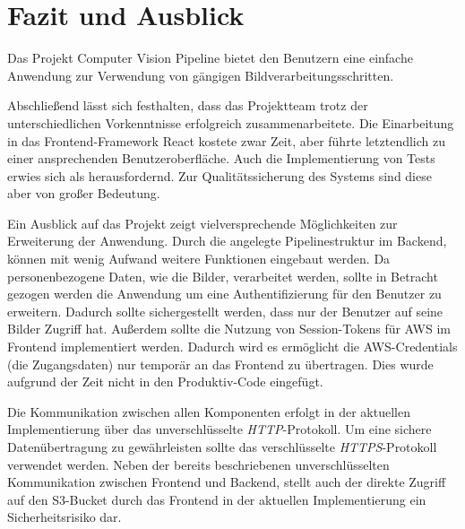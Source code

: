 \section{Fazit und Ausblick}
Das Projekt Computer Vision Pipeline bietet den Benutzern eine einfache Anwendung zur Verwendung von gängigen Bildverarbeitungsschritten.

Abschließend lässt sich festhalten, dass das Projektteam trotz der unterschiedlichen Vorkenntnisse erfolgreich zusammenarbeitete. Die Einarbeitung in das Frontend-Framework React kostete zwar Zeit, aber führte letztendlich zu einer ansprechenden Benutzeroberfläche. Auch die Implementierung von Tests erwies sich als herausfordernd. Zur Qualitätssicherung des Systems sind diese aber von großer Bedeutung.

Ein Ausblick auf das Projekt zeigt vielversprechende Möglichkeiten zur Erweiterung der Anwendung. Durch die angelegte Pipelinestruktur im Backend, können mit wenig Aufwand weitere Funktionen eingebaut werden. Da personenbezogene Daten, wie die Bilder, verarbeitet werden, sollte in Betracht gezogen werden die Anwendung um eine Authentifizierung für den Benutzer zu erweitern. Dadurch sollte sichergestellt werden, dass nur der Benutzer auf seine Bilder Zugriff hat. Außerdem sollte die Nutzung von Session-Tokens für AWS im Frontend implementiert werden. Dadurch wird es ermöglicht die AWS-Credentials (die Zugangsdaten) nur temporär an das Frontend zu übertragen. Dies wurde aufgrund der Zeit nicht in den Produktiv-Code eingefügt. 

Die Kommunikation zwischen allen Komponenten erfolgt in der aktuellen Implementierung über das unverschlüsselte \textit{HTTP}-Protokoll. Um eine sichere Datenübertragung zu gewährleisten sollte das verschlüsselte \textit{HTTPS}-Protokoll verwendet werden. Neben der bereits beschriebenen unverschlüsselten Kommunikation zwischen Frontend und Backend, stellt auch der direkte Zugriff auf den S3-Bucket durch das Frontend in der aktuellen Implementierung ein Sicherheitsrisiko dar.